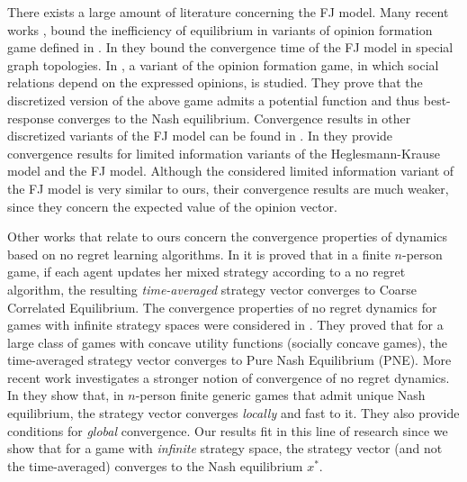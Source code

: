 There exists a large amount of literature concerning the FJ model.  Many recent
works \cite{BGM13,CKO13}, \cite{BFM16,EFHS17} bound the inefficiency of
equilibrium in variants of opinion formation game defined in \cite{BKO11}. In
\cite{GS14} they bound the convergence time of the FJ model in special graph
topologies.  In \cite{BFM16}, a variant of the opinion formation game, in which
social relations depend on the expressed opinions, is studied.  They prove that
the discretized version of the above game admits a potential function and thus
best-response converges to the Nash equilibrium.  Convergence results in other
discretized variants of the FJ model can be found in \cite{YOASS13,FGV16}. In
\cite{FPS16} they provide convergence results for limited information variants
of the Heglesmann-Krause model \cite{HK} and the FJ model. Although the
considered limited information variant of the FJ model is very similar to ours,
their convergence results are much weaker, since they concern the expected
value of the opinion vector.

Other works that relate to ours concern the convergence properties of dynamics
based on no regret learning algorithms.  In \cite{FV97,FS99,SA00,SALS15} it is
proved that in a finite $n$-person game, if each agent updates her mixed
strategy according to a no regret algorithm, the resulting \emph{time-averaged}
strategy vector converges to Coarse Correlated Equilibrium. The convergence
properties of no regret dynamics for games with infinite strategy spaces were
considered in \cite{EMN09}.  They proved that for a large class of games with
concave utility functions (socially concave games), the time-averaged strategy
vector converges to Pure Nash Equilibrium (PNE). More recent work investigates
a stronger notion of convergence of no regret dynamics. In \cite{CHM17} they
show that, in $n$-person finite generic games that admit unique Nash
equilibrium, the strategy vector converges \emph{locally} and fast to it.  They
also provide conditions for \emph{global} convergence.  Our results fit in this
line of research since we show that for a game with \emph{infinite} strategy
space, the strategy vector (and not the time-averaged) converges to the Nash
equilibrium $x^*$.


